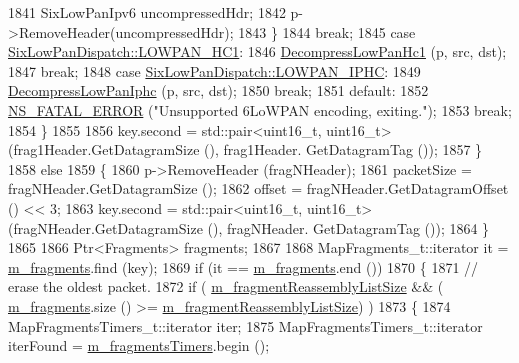 \begin{DoxyCode}
1841             SixLowPanIpv6 uncompressedHdr;
1842             p->RemoveHeader(uncompressedHdr);
1843           \}
1844          \textcolor{keywordflow}{break};
1845         \textcolor{keywordflow}{case} \hyperlink{classns3_1_1SixLowPanDispatch_aa51561db1ae4239db574d31d7aebbb5fa359c3405a418613875f04bbd3e973357}{SixLowPanDispatch::LOWPAN\_HC1}:
1846           \hyperlink{classns3_1_1SixLowPanNetDevice_a649ef9717609424699311ea61c8e3fc8}{DecompressLowPanHc1} (p, src, dst);
1847           \textcolor{keywordflow}{break};
1848         \textcolor{keywordflow}{case} \hyperlink{classns3_1_1SixLowPanDispatch_aa51561db1ae4239db574d31d7aebbb5fa7a0ab465ff9aacb2f3680baec6cacf15}{SixLowPanDispatch::LOWPAN\_IPHC}:
1849           \hyperlink{classns3_1_1SixLowPanNetDevice_ae861be68db1b554cc3e5ea5e263b12ed}{DecompressLowPanIphc} (p, src, dst);
1850           \textcolor{keywordflow}{break};
1851         \textcolor{keywordflow}{default}:
1852           \hyperlink{group__fatal_ga5131d5e3f75d7d4cbfd706ac456fdc85}{NS\_FATAL\_ERROR} (\textcolor{stringliteral}{"Unsupported 6LoWPAN encoding, exiting."});
1853           \textcolor{keywordflow}{break};
1854         \}
1855 
1856       key.second = std::pair<uint16\_t, uint16\_t> (frag1Header.GetDatagramSize (), frag1Header.
      GetDatagramTag ());
1857     \}
1858   \textcolor{keywordflow}{else}
1859     \{
1860       p->RemoveHeader (fragNHeader);
1861       packetSize = fragNHeader.GetDatagramSize ();
1862       offset = fragNHeader.GetDatagramOffset () << 3;
1863       key.second = std::pair<uint16\_t, uint16\_t> (fragNHeader.GetDatagramSize (), fragNHeader.
      GetDatagramTag ());
1864     \}
1865 
1866   Ptr<Fragments> fragments;
1867 
1868   MapFragments\_t::iterator it = \hyperlink{classns3_1_1SixLowPanNetDevice_aed9787c7dcee491945b752d0baa69d09}{m\_fragments}.find (key);
1869   \textcolor{keywordflow}{if} (it == \hyperlink{classns3_1_1SixLowPanNetDevice_aed9787c7dcee491945b752d0baa69d09}{m\_fragments}.end ())
1870     \{
1871       \textcolor{comment}{// erase the oldest packet.}
1872       \textcolor{keywordflow}{if} ( \hyperlink{classns3_1_1SixLowPanNetDevice_acf2402dc29d4865287993a508b74c855}{m\_fragmentReassemblyListSize} && (
      \hyperlink{classns3_1_1SixLowPanNetDevice_aed9787c7dcee491945b752d0baa69d09}{m\_fragments}.size () >= \hyperlink{classns3_1_1SixLowPanNetDevice_acf2402dc29d4865287993a508b74c855}{m\_fragmentReassemblyListSize}) )
1873         \{
1874           MapFragmentsTimers\_t::iterator iter;
1875           MapFragmentsTimers\_t::iterator iterFound = \hyperlink{classns3_1_1SixLowPanNetDevice_ac1f25bfd21a90f1419db0ecf1ea82547}{m\_fragmentsTimers}.begin ();

\end{DoxyCode}
